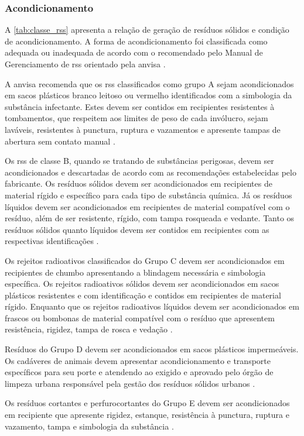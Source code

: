 \subsubsection{Acondicionamento}
A \autoref{tab:classe_rss} apresenta a relação de geração de resíduos sólidos e condição de acondicionamento. A forma de acondicionamento foi classificada como adequada ou inadequada de acordo com o recomendado pelo Manual de Gerenciamento de \gls{rss} orientado pela \gls{anvisa} \cite{anvisa:2006}. 

A \gls{anvisa} recomenda que os \gls{rss} classificados como grupo A sejam acondicionados em sacos plásticos branco leitoso ou vermelho identificados com a simbologia da substância infectante. Estes devem ser contidos em recipientes resistentes à tombamentos, que respeitem aos limites de peso de cada invólucro, sejam laváveis, resistentes à punctura, ruptura e vazamentos e apresente tampas de abertura sem contato manual \cite{anvisa:2006}.

Os \gls{rss} de classe B, quando se tratando de substâncias perigosas, devem ser acondicionados e descartadas de acordo com as recomendações estabelecidas pelo fabricante. Os resíduos sólidos devem ser acondicionados em recipientes de material rígido e específico para cada tipo de substância química. Já os resíduos líquidos devem ser acondicionados em recipientes de material compatível com o resíduo, além de ser resistente, rígido, com tampa rosqueada e vedante. Tanto os resíduos sólidos quanto líquidos devem ser contidos em recipientes com as respectivas identificações \cite{anvisa:2006}.

Os rejeitos radioativos classificados do Grupo C devem ser acondicionados em recipientes de chumbo apresentando a blindagem necessária e simbologia específica. Os rejeitos radioativos sólidos devem ser acondicionados em sacos plásticos resistentes e com identificação e contidos em recipientes de material rígido. Enquanto que os rejeitos radioativos líquidos devem ser acondicionados em frascos ou bombonas de material compatível com o resíduo que apresentem resistência, rigidez, tampa de rosca e vedação \cite{anvisa:2006}. 

Resíduos do Grupo D devem ser acondicionados em sacos plásticos impermeáveis. Os cadáveres de animais devem apresentar acondicionamento e transporte específicos para seu porte e atendendo ao exigido e aprovado pelo órgão de limpeza urbana responsável pela gestão dos resíduos sólidos urbanos \cite{anvisa:2006}.

Os resíduos cortantes e perfurocortantes do Grupo E devem ser acondicionados em recipiente que apresente rigidez, estanque, resistência à punctura, ruptura e vazamento, tampa e simbologia da substância \cite{anvisa:2006}.


